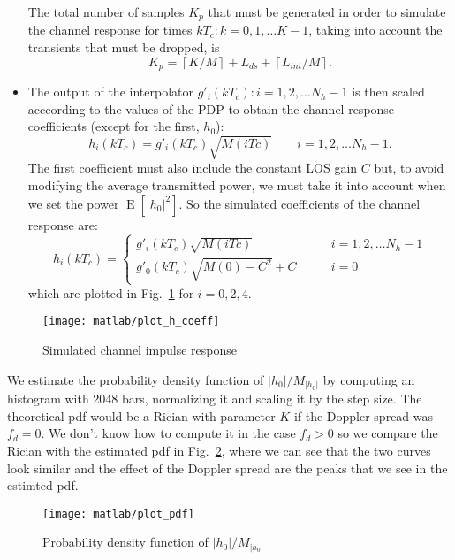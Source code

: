 \documentclass[a4paper,twoside]{article}
\newcommand{\E}[1]{\operatorname{E}\left[#1\right]}
\newcommand{\abs}[1]{\left|#1\right|}
\newcommand{\ceil}[1]{\left\lceil#1\right\rceil}
\begin{document}
\begin{itemize}
      The total number of samples $K_p$ that must be generated in
      order to simulate the channel response for times $kT_c :
      k=0,1,\dots K-1$, taking into account the transients that must
      be dropped, is
      \begin{equation}
        K_p = \ceil{K/M} + L_{ds} + \ceil{L_{int}/M} .
        \label{eq:Kp}
      \end{equation}
      \item The output of the interpolator $g'_i(kT_c) : i=1,2,\dots
        N_h-1$ is then scaled acccording to the values of the PDP to
        obtain the channel response coefficients (except for the
        first, $h_0$):
        \begin{equation}
          h_i(kT_c) = g'_i(kT_c) \sqrt{M(iTc)} \qquad i=1,2,\dots N_h-1 .
        \end{equation}
        The first coefficient must also include the constant LOS gain
        $C$ but, to avoid modifying the average transmitted power, we
        must take it into account when we set the power
        $\E{\abs{h_0}^2}$. So the simulated coefficients of the
        channel response are:
        \begin{equation}
          h_i(kT_c) = \begin{cases}
            g'_i(kT_c) \sqrt{M(iTc)} \qquad & i=1,2,\dots N_h-1 \\
            g'_0(kT_c) \sqrt{M(0) - C^2} + C \qquad & i=0
            \end{cases}
        \end{equation}
        which are plotted in Fig.~\ref{plot:h_coeff} for $i=0,2,4$.
\end{itemize}
\begin{figure}[p]
  \centering
  \texttt{[image: matlab/plot\_h\_coeff]}
  \caption{Simulated channel impulse response}
  \label{plot:h_coeff}
\end{figure}

We estimate the probability density function of
$\abs{h_0}/M_{\abs{h_0}}$ by computing an histogram with 2048 bars,
normalizing it and scaling it by the step size. The theoretical pdf
would be a Rician with parameter $K$ if the Doppler spread was $f_d =
0$. We don't know how to compute it in the case $f_d > 0$ so we
compare the Rician with the estimated pdf in Fig.~\ref{plot:pdf},
where we can see that the two curves look similar and the effect of
the Doppler spread are the peaks that we see in the estimted pdf.
\begin{figure}[htbp]
  \centering
  \texttt{[image: matlab/plot\_pdf]}
  \caption{Probability density function of $\abs{h_0}/M_{\abs{h_0}}$}
  \label{plot:pdf}
\end{figure}
\end{document}
